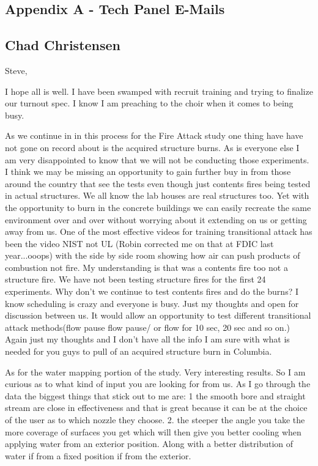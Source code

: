 \documentclass[12pt,oneside]{book}
\begin{document}
\begin{appendix}

\chapter*{Appendix A - Tech Panel E-Mails}
\label{panel_responses}

\section{Chad Christensen}

Steve,
 
I hope all is well.  I have been swamped with recruit training and trying to finalize our turnout spec. I know I am preaching to the choir when it comes to being busy.  
 
As we continue in in this process for the Fire Attack study one thing have have not gone on record about is the acquired structure burns.  As is everyone else I am very disappointed to know that we will not be conducting those experiments. I think we may be missing an opportunity to gain further buy in from those around the country that see the tests even though just contents fires being tested in actual structures.  We all know the lab houses are real structures too.  Yet with the opportunity to burn in the concrete buildings we can easily recreate the same environment over and over without worrying about it extending on us or getting away from us.  One of the most effective videos for training transitional attack  has been the video NIST not UL (Robin corrected me on that at FDIC last year...ooops) with the side by side room showing how air can push products of combustion not fire. My understanding is that was a contents fire too not a structure fire.  We have not been testing structure fires for the first 24 experiments.  Why don't we continue to test contents fires and do the burns?  I know scheduling is crazy and everyone is busy. Just my thoughts and open for discussion between us.  It would allow an opportunity to test different transitional attack methods(flow pause flow pause/ or flow for 10 sec, 20 sec and so on.)  Again just my thoughts and I don't have all the info I am sure with what is needed for you guys to pull of an acquired structure burn in Columbia.   
 
As for the water mapping portion of the study.  Very interesting results.  So I am curious as to what kind of input you are looking for from us.  As I go through the data the biggest things that stick out to me are: 
1 the smooth bore and straight stream are close in effectiveness and that is great because it can be at the choice of the user as to which nozzle they choose. 
2. the steeper the angle you take the more coverage of surfaces you get which will then give you better cooling when applying water from an exterior position.  Along with a better distribution of water if from a fixed position if from the exterior.  
 

\end{appendix}
\end{document}
